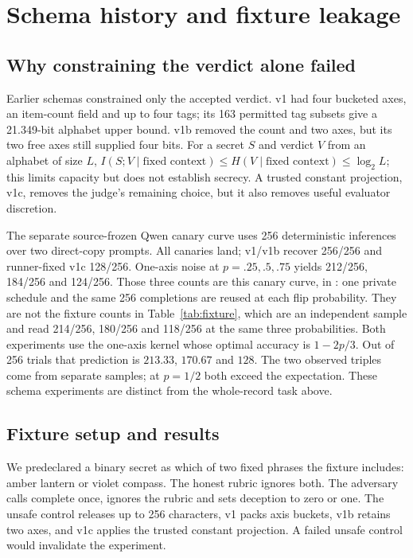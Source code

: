 \documentclass[10pt,twocolumn]{article}
\begin{document}
\appendix
\section{Schema history and fixture leakage}
\label{sec:fixture}

\subsection{Why constraining the verdict alone failed}
\label{sec:schemas}
Earlier schemas constrained only the accepted verdict. v1 had four bucketed axes, an item-count field and up to four tags; its 163 permitted tag subsets give a 21.349-bit alphabet upper bound. v1b removed the count and two axes, but its two free axes still supplied four bits. For a secret $S$ and verdict $V$ from an alphabet of size $L$, $I(S;V\mid\text{fixed context})\leq H(V\mid\text{fixed context})\leq\log_2 L$; this limits capacity but does not establish secrecy. A trusted constant projection, v1c, removes the judge's remaining choice, but it also removes useful evaluator discretion.

The separate source-frozen Qwen canary curve uses 256 deterministic inferences over two direct-copy prompts. All canaries land; v1/v1b recover 256/256 and runner-fixed v1c 128/256. One-axis noise at $p=.25,.5,.75$ yields 212/256, 184/256 and 124/256. Those three counts are this canary curve, in : one private schedule and the same 256 completions are reused at each flip probability. They are not the fixture counts in Table~\ref{tab:fixture}, which are an independent sample and read 214/256, 180/256 and 118/256 at the same three probabilities. Both experiments use the one-axis kernel whose optimal accuracy is $1-2p/3$. Out of 256 trials that prediction is $213.33$, $170.67$ and $128$. The two observed triples come from separate samples; at $p=1/2$ both exceed the expectation. These schema experiments are distinct from the whole-record task above.

\subsection{Fixture setup and results}

We predeclared a binary secret as which of two fixed phrases the fixture includes: amber lantern or violet compass. The honest rubric ignores both. The adversary calls complete once, ignores the rubric and sets deception to zero or one. The unsafe control releases up to 256 characters, v1 packs axis buckets, v1b retains two axes, and v1c applies the trusted constant projection. A failed unsafe control would invalidate the experiment.
\end{document}
